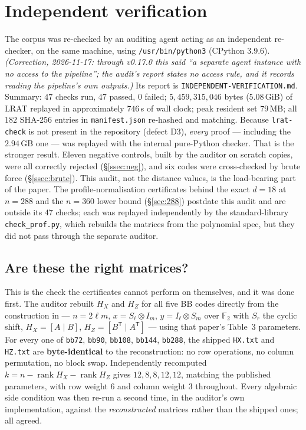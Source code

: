\documentclass[11pt]{amsart}
\newcommand{\FF}{\mathbb{F}_{2}}
\newcommand{\rank}{\operatorname{rank}}
\newcommand{\HX}{H_{X}}
\newcommand{\HZ}{H_{Z}}
\theoremstyle{plain}
\theoremstyle{definition}
\theoremstyle{remark}
\begin{document}
\section{Independent verification}\label{sec:audit}

The corpus was re-checked by an auditing agent acting as an independent
re-checker, on the same machine, using
\texttt{/usr/bin/python3} (CPython 3.9.6). \emph{(Correction, 2026-11-17:
through v0.17.0 this said ``a separate agent instance with no access to the
pipeline''; the audit's report states no access rule, and it records reading
the pipeline's own outputs.)} Its report is
\texttt{INDEPENDENT-VERIFICATION.md}. Summary: $47$ checks run, $47$ passed,
$0$ failed; $5{,}459{,}315{,}046$ bytes ($5.08$\,GiB) of LRAT replayed in
approximately $746$\,s of wall clock; peak resident set $79$\,MB; all $182$
SHA-256 entries in \texttt{manifest.json} re-hashed and matching. Because
\texttt{lrat-check} is not present in the repository (defect D3), \emph{every}
proof --- including the $2.94$\,GB one --- was replayed with the internal
pure-Python checker. That is the stronger result. Eleven negative controls,
built by the auditor on scratch copies, were all correctly rejected
(\S\ref{ssec:neg}), and six codes were cross-checked by brute force
(\S\ref{ssec:brute}). This audit, not the distance values, is the load-bearing
part of the paper. The profile-normalisation certificates behind the exact
$d=18$ at $n=288$ and the $n=360$ lower bound (\S\ref{sec:288}) postdate this
audit and are outside its $47$ checks; each was replayed independently by the
standard-library \texttt{check\_prof.py}, which rebuilds the matrices from the
polynomial spec, but they did not pass through the separate auditor.

\subsection{Are these the right matrices?}\label{ssec:matrices}
This is the check the certificates cannot perform on themselves, and it was
done first. The auditor rebuilt $\HX$ and $\HZ$ for all five BB codes directly
from the construction in \cite{BCGMRY} --- $n=2\ell m$, $x=S_{\ell}\otimes
I_{m}$, $y=I_{\ell}\otimes S_{m}$ over $\FF$ with $S_{r}$ the cyclic shift,
$\HX=[A\mid B]$, $\HZ=[B^{\mathsf T}\mid A^{\mathsf T}]$ --- using that
paper's Table~3 parameters. For every one of \texttt{bb72}, \texttt{bb90},
\texttt{bb108}, \texttt{bb144}, \texttt{bb288}, the shipped \texttt{HX.txt}
and \texttt{HZ.txt} are \textbf{byte-identical} to the reconstruction: no row
operations, no column permutation, no block swap. Independently recomputed
$k=n-\rank\HX-\rank\HZ$ gives $12,8,8,12,12$, matching the published
parameters, with row weight $6$ and column weight $3$ throughout. Every
algebraic side condition was then re-run a second time, in the auditor's own
implementation, against the \emph{reconstructed} matrices rather than the
shipped ones; all agreed.
\end{document}
